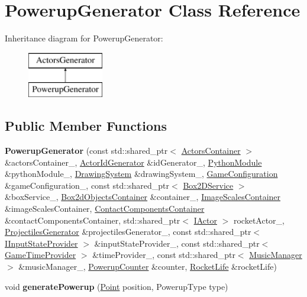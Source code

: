 \hypertarget{classPowerupGenerator}{}\section{Powerup\+Generator Class Reference}
\label{classPowerupGenerator}
Inheritance diagram for Powerup\+Generator\+:\begin{figure}[H]
\begin{center}
\leavevmode
\includegraphics[height=2.000000cm]{classPowerupGenerator}
\end{center}
\end{figure}
\subsection*{Public Member Functions}
\begin{DoxyCompactItemize}
\item 
{\bfseries Powerup\+Generator} (const std\+::shared\+\_\+ptr$<$ \hyperlink{classActorsContainer}{Actors\+Container} $>$ \&actors\+Container\+\_\+, \hyperlink{classActorIdGenerator}{Actor\+Id\+Generator} \&id\+Generator\+\_\+, \hyperlink{classPythonModule}{Python\+Module} \&python\+Module\+\_\+, \hyperlink{classDrawingSystem}{Drawing\+System} \&drawing\+System\+\_\+, \hyperlink{classGameConfiguration}{Game\+Configuration} \&game\+Configuration\+\_\+, const std\+::shared\+\_\+ptr$<$ \hyperlink{classBox2DService}{Box2\+D\+Service} $>$ \&box\+Service\+\_\+, \hyperlink{classBox2dObjectsContainer}{Box2d\+Objects\+Container} \&container\+\_\+, \hyperlink{classImageScalesContainer}{Image\+Scales\+Container} \&image\+Scales\+Container, \hyperlink{classContactComponentsContainer}{Contact\+Components\+Container} \&contact\+Components\+Container, std\+::shared\+\_\+ptr$<$ \hyperlink{classIActor}{I\+Actor} $>$ rocket\+Actor\+\_\+, \hyperlink{classProjectilesGenerator}{Projectiles\+Generator} \&projectiles\+Generator\+\_\+, const std\+::shared\+\_\+ptr$<$ \hyperlink{classIInputStateProvider}{I\+Input\+State\+Provider} $>$ \&input\+State\+Provider\+\_\+, const std\+::shared\+\_\+ptr$<$ \hyperlink{classGameTimeProvider}{Game\+Time\+Provider} $>$ \&time\+Provider\+\_\+, const std\+::shared\+\_\+ptr$<$ \hyperlink{classMusicManager}{Music\+Manager} $>$ \&music\+Manager\+\_\+, \hyperlink{classPowerupCounter}{Powerup\+Counter} \&counter, \hyperlink{classRocketLife}{Rocket\+Life} \&rocket\+Life)\hypertarget{classPowerupGenerator_af957833c19dca163450a27db0951836a}{}\label{classPowerupGenerator_af957833c19dca163450a27db0951836a}

\item 
void {\bfseries generate\+Powerup} (\hyperlink{classPoint}{Point} position, Powerup\+Type type)\hypertarget{classPowerupGenerator_a7e18ec355314e252d7e6a3de9b612509}{}\label{classPowerupGenerator_a7e18ec355314e252d7e6a3de9b612509}

\end{DoxyCompactItemize}
